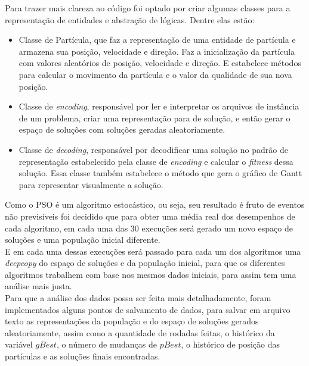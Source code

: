 Para trazer mais clareza ao código foi optado por criar algumas classes para a representação de entidades e abstração de lógicas. Dentre elas estão:\\
\begin{itemize}
    \item Classe de Partícula, que faz a representação de uma entidade de partícula e armazena sua posição, velocidade e direção. Faz a inicialização da partícula com valores aleatórios de posição, velocidade e direção. E estabelece métodos para calcular o movimento da partícula e o valor da qualidade de sua nova posição.

    \item Classe de \textit{encoding}, responsável por ler e interpretar os arquivos de instância de um problema, criar uma representação para de solução, e então gerar o espaço de soluções com soluções geradas aleatoriamente.

    \item Classe de \textit{decoding}, responsável por decodificar uma solução no padrão de representação estabelecido pela classe de \textit{encoding} e calcular o \textit{fitness} dessa solução. Essa classe também estabelece o método que gera o gráfico de Gantt para representar visualmente a solução.
\end{itemize}

\indent Como o PSO é um algoritmo estocástico, ou seja, seu resultado é fruto de eventos não previsíveis foi decidido que para obter uma média real dos desempenhos de cada algoritmo, em cada uma das 30 execuções será gerado um novo espaço de soluções e uma população inicial diferente.\\
\indent E em cada uma dessas execuções será passado para cada um dos algoritmos uma \textit{deepcopy} do espaço de soluções e da população inicial, para que os diferentes algoritmos trabalhem com base nos mesmos dados iniciais, para assim tem uma análise mais justa.\\
\indent Para que a análise dos dados possa ser feita mais detalhadamente, foram implementados alguns pontos de salvamento de dados, para salvar em arquivo texto as representações da população e do espaço de soluções gerados aleatoriamente, assim como a quantidade de rodadas feitas, o histórico da variável $gBest$, o número de mudanças de $pBest$, o histórico de posição das partículas e as soluções finais encontradas.
%
    

